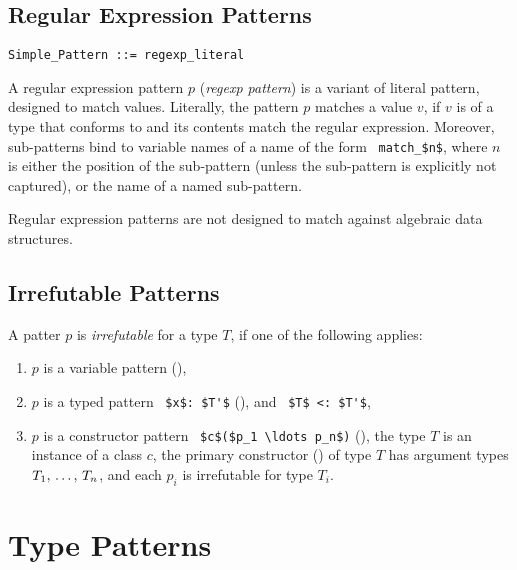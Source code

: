 \subsection{Regular Expression Patterns}
\label{sec:regexp-patterns}

\syntax\begin{lstlisting}
Simple_Pattern ::= regexp_literal
\end{lstlisting}

A regular expression pattern $p$ ({\em regexp pattern}) is a variant of literal pattern, designed to match  values. Literally, the pattern $p $ matches a value $v$, if $v$ is of a type that conforms to  and its contents match the regular expression. Moreover, sub-patterns bind to variable names of a name of the form ~\lstinline!match_$n$!, where $n$ is either the position of the sub-pattern (unless the sub-pattern is explicitly not captured), or the name of a named sub-pattern. 

Regular expression patterns are not designed to match against algebraic data structures. 

\subsection{Irrefutable Patterns}
\label{sec:irrefutable-patterns}

A patter $p$ is {\em irrefutable} for a type $T$, if one of the following applies: 
\begin{enumerate}
\item $p$ is a variable pattern (),
\item $p$ is a typed pattern ~\lstinline!$x$: $T'$! (), and ~\lstinline!$T$ <: $T'$!,
\item $p$ is a constructor pattern ~\lstinline!$c$($p_1 \ldots p_n$)! (), the type $T$ is an instance of a class $c$, the primary constructor () of type $T$ has argument types $T_1 ,\, \ldots ,\, T_n$, and each $p_i$ is irrefutable for type $T_i$. 
\end{enumerate}






\section{Type Patterns}
\label{sec:type-patterns}

